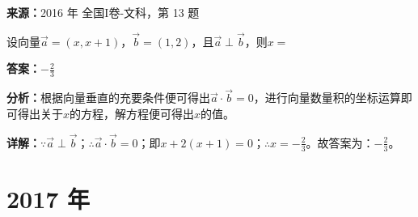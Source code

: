 \begin{question}[points=5]
\textbf{来源：}2016 年 全国I卷-文科，第 13 题\par
设向量$\vec{a}=(x,x+1)$，$\vec{b}=(1,2)$，且$\vec{a}\perp\vec{b}$，则$x=$
\fillin[{$-\frac{2}{3}$}]
\begin{solution}
\textbf{答案：}$-\frac{2}{3}$

\textbf{分析：}根据向量垂直的充要条件便可得出$\vec{a}\cdot\vec{b}=0$，进行向量数量积的坐标运算即可得出关于$x$的方程，解方程便可得出$x$的值。

\textbf{详解：}$\because \vec{a}\perp\vec{b}$；$\therefore \vec{a}\cdot\vec{b}=0$；即$x+2(x+1)=0$；$\therefore x=-\frac{2}{3}$。故答案为：$-\frac{2}{3}$。
\end{solution}
\end{question}

\section*{2017 年}


